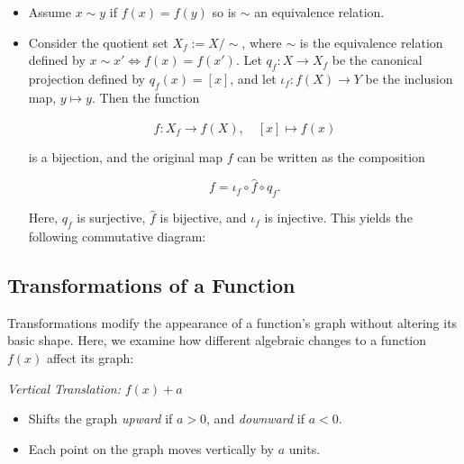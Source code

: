 \begin{itemize}

	\item Assume \(x \sim y \) if \(f(x)= f(y)\) so is \(\sim\) an equivalence relation.

	\item Consider the quotient set \( X_f := X/\sim \), where \( \sim \) is the equivalence relation 
	      defined by \( x \sim x' \iff f(x) = f(x') \). Let \( q_f : X \to X_f \) be the canonical 
		  projection defined by \( q_f(x) = [x] \), and let \( \iota_f : f(X) \to Y \) be the inclusion  
		  map, \( y \mapsto y \). Then the function
	      
		  \[
		      \hat{f} : X_f \to f(X), \quad [x] \mapsto f(x)
	      \]
	  
		  is a bijection, and the original map \(f\) can be written as the composition
	 
		  \[
		      f = \iota_f \circ \hat{f} \circ q_f.
	      \]
	 
		  Here, \( q_f \) is surjective, \( \hat{f} \) is bijective, and \( \iota_f \) is injective. 
		  This yields the following commutative diagram:
	      
		  \begin{center}
	      \end{center}

\end{itemize}

\subsection{Transformations of a Function}

Transformations modify the appearance of a function's graph without altering its basic shape.
Here, we examine how different algebraic changes to a function \( f(x) \) affect its graph:

\emph{Vertical Translation:} \( f(x) + a \)
	    
\begin{itemize}
	
	\item Shifts the graph \emph{upward} if \( a > 0 \), and \emph{downward} if \( a < 0 \).
	
	\item Each point on the graph moves vertically by \(a\) units.

\end{itemize}

